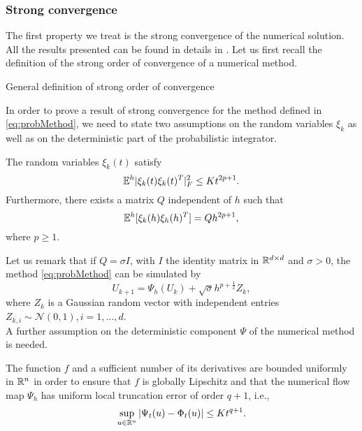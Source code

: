 \subsubsection{Strong convergence}

The first property we treat is the strong convergence of the numerical solution. All the results presented can be found in details in \cite{CGS16}. Let us first recall the definition of the strong order of convergence of a numerical method. 
\begin{definition} General definition of strong order of convergence
\end{definition}
\noindent In order to prove a result of strong convergence for the method defined in \eqref{eq:probMethod}, we need to state two assumptions on the random variables $\xi_k$ as well as on the deterministic part of the probabilistic integrator. 
\begin{assumption}\label{assumption_1} The random variables $\xi_k(t)$ satisfy
\begin{equation}
	\mathbb{E}^h|\xi_k(t)\xi_k(t)^T|^2_F \leq Kt^{2p+1}.
\end{equation}
Furthermore, there exists a matrix $Q$ independent of $h$ such that 
\begin{equation}
	\mathbb{E}^h[\xi_k(h)\xi_h(h)^T] = Qh^{2p+1},
\end{equation}
where $p\geq 1$.
\end{assumption}
\noindent Let us remark that if $Q = \sigma I$, with $I$ the identity matrix in $\mathbb{R}^{d\times d}$ and $\sigma > 0$, the method \eqref{eq:probMethod} can be simulated by
\begin{equation}
	U_{k+1} = \Psi_h(U_k) + \sqrt{\sigma} h^{p + \frac{1}{2}} Z_k,
\end{equation}
where $Z_k$ is a Gaussian random vector with independent entries $Z_{k,i}  \sim\mathcal{N}(0,1), i = 1, \ldots, d$. \\
A further assumption on the deterministic component $\Psi$ of the numerical method is needed.
\begin{assumption}\label{assumption_2}  The function $f$ and a sufficient number of its derivatives are bounded uniformly in $\mathbb{R}^n$ in order to ensure that $f$ is globally Lipschitz and that the numerical flow map $\Psi_h$ has uniform local truncation error of order $q + 1$, i.e., 
\begin{equation}
	\sup_{u\in\mathbb{R}^n} |\Psi_t(u) - \Phi_t(u)| \leq Kt^{q+1}.
\end{equation}
\end{assumption}
